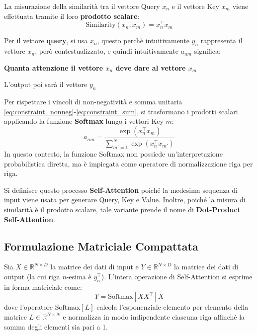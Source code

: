 La misurazione della similarità tra il vettore Query $x_n$ e il vettore Key $x_m$ viene effettuata tramite il loro \textbf{prodotto scalare}:
\begin{equation}
\text{Similarity}(x_n, x_m) = x_n^\top x_m
\end{equation}

Per il vettore \textbf{query}, si usa $x_n$, questo perchè intuitivamente $y_n$ rappresenta il vettore $x_n$, però contestualizzato, e quindi intuitivamente $a_{nm}$ significa:
\begin{center}
    \textbf{Quanta attenzione il vettore $x_n$ deve dare al vettore $x_m$}
\end{center}
L'output poi sarà il vettore $y_n$


Per rispettare i vincoli di non-negatività e somma unitaria \eqref{eq:constraint_nonneg}-\eqref{eq:constraint_sum}, si trasformano i prodotti scalari applicando la funzione \textbf{Softmax} lungo i vettori Key $m$:
\begin{equation}
a_{nm} = \frac{\exp\left(x_n^\top x_m\right)}{\sum_{m'=1}^{N} \exp\left(x_n^\top x_{m'}\right)} \label{eq:softmax_attention_basic}
\end{equation}
In questo contesto, la funzione Softmax non possiede un'interpretazione probabilistica diretta, ma è impiegata come operatore di normalizzazione riga per riga.

Si definisce questo processo \textbf{Self-Attention} poiché la medesima sequenza di input viene usata per generare Query, Key e Value. Inoltre, poiché la misura di similarità è il prodotto scalare, tale variante prende il nome di \textbf{Dot-Product Self-Attention}.



\subsection{Formulazione Matriciale Compattata}
Sia $X \in \mathbb{R}^{N \times D}$ la matrice dei dati di input e $Y \in \mathbb{R}^{N \times D}$ la matrice dei dati di output (la cui riga $n$-esima è $y_n^\top$). L'intera operazione di Self-Attention si esprime in forma matriciale come:
\begin{equation}
Y = \text{Softmax}\left[ X X^\top \right] X
\end{equation}
dove l'operatore $\text{Softmax}[L]$ calcola l'esponenziale elemento per elemento della matrice $L \in \mathbb{R}^{N \times N}$ e normalizza in modo indipendente ciascuna riga affinché la somma degli elementi sia pari a 1.

